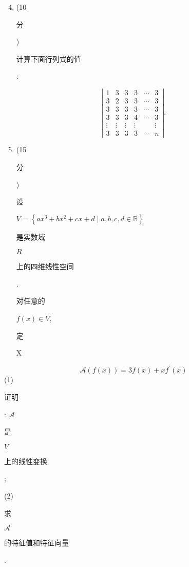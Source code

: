 \documentclass[10pt]{article}
\begin{document}
\begin{enumerate}
  \setcounter{enumi}{3}
  \item (10 \begin{CJK}{UTF8}{mj}分\end{CJK}) \begin{CJK}{UTF8}{mj}计算下面行列式的值\end{CJK}:
\end{enumerate}
$$
\left|\begin{array}{cccccc}
1 & 3 & 3 & 3 & \cdots & 3 \\
3 & 2 & 3 & 3 & \cdots & 3 \\
3 & 3 & 3 & 3 & \cdots & 3 \\
3 & 3 & 3 & 4 & \cdots & 3 \\
\vdots & \vdots & \vdots & \vdots & & \vdots \\
3 & 3 & 3 & 3 & \cdots & n
\end{array}\right| .
$$

\begin{enumerate}
  \setcounter{enumi}{4}
  \item (15 \begin{CJK}{UTF8}{mj}分\end{CJK}) \begin{CJK}{UTF8}{mj}设\end{CJK} $V=\left\{a x^{3}+b x^{2}+c x+d \mid a, b, c, d \in \mathbb{R}\right\}$ \begin{CJK}{UTF8}{mj}是实数域\end{CJK} $R$ \begin{CJK}{UTF8}{mj}上的四维线性空间\end{CJK}. \begin{CJK}{UTF8}{mj}对任意的\end{CJK} $f(x) \in V$, \begin{CJK}{UTF8}{mj}定\end{CJK} X
\end{enumerate}
$$
\mathscr{A}(f(x))=3 f(x)+x f^{\prime}(x)
$$
(1) \begin{CJK}{UTF8}{mj}证明\end{CJK}: $\mathscr{A}$ \begin{CJK}{UTF8}{mj}是\end{CJK} $V$ \begin{CJK}{UTF8}{mj}上的线性变换\end{CJK};

(2) \begin{CJK}{UTF8}{mj}求\end{CJK} $\mathscr{A}$ \begin{CJK}{UTF8}{mj}的特征值和特征向量\end{CJK}.
\end{document}
